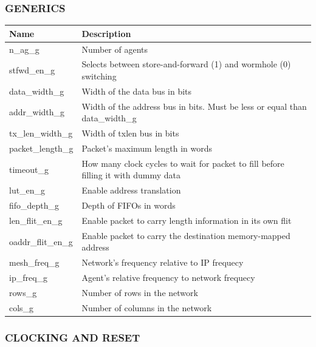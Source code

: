 \documentclass[a4paper,10pt,oneside,final]{article}
\def\deftablecolora{blue!10!white}
\def\deftablecolorb{white}
\begin{document}
\subsubsection{GENERICS}

\begin{center}
  \rowcolors{3}{\deftablecolora}{\deftablecolorb}

  \begin{tabularx}{\textwidth}{|lX|}
    \hline
    Name                & Description\\
    \hline
    n\_ag\_g          & Number of agents\\
    stfwd\_en\_g      & Selects between store-and-forward (1) 
                          and wormhole (0) switching\\
    data\_width\_g    & Width of the data bus in bits\\
    addr\_width\_g    & Width of the address bus in bits. Must be less 
                          or equal than data\_width\_g\\
    tx\_len\_width\_g & Width of txlen bus in bits\\
    packet\_length\_g & Packet's maximum length in words\\
    timeout\_g        & How many clock cycles to wait for packet to fill
                        before filling it with dummy data\\
    lut\_en\_g        & Enable address translation\\
    fifo\_depth\_g    & Depth of FIFOs in words\\
    len\_flit\_en\_g  & Enable packet to carry length information in 
                           its own flit\\
    oaddr\_flit\_en\_g & Enable packet to carry the destination 
                             memory-mapped address\\
    mesh\_freq\_g  & Network's frequency relative to IP  frequecy\\
    ip\_freq\_g    & Agent's relative frequency to network frequecy\\
    rows\_g & Number of rows in the network\\
    cols\_g & Number of columns in the network\\
    \hline
  \end{tabularx}
\end{center}

\subsubsection{CLOCKING AND RESET}
\end{document}
